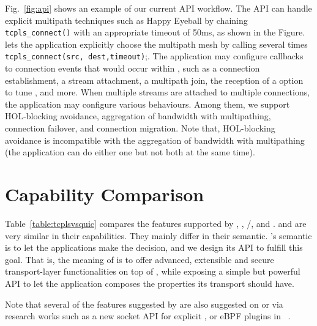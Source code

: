 Fig.~\ref{fig:api} shows an example of our current API workflow. The API can
handle explicit multipath techniques such as Happy Eyeball by chaining
\texttt{tcpls\_connect()} with an appropriate timeout of 50ms, as shown in the
Figure. \tcpls lets the application explicitly choose the multipath mesh by
calling several times \texttt{tcpls\_connect(src, dest,timeout)};. The
application may configure callbacks to connection events that would occur within
\tcpls, such as a connection establishment, a stream attachment, a multipath
join, the reception of a \tcp option to tune \tcp, and more. When multiple
streams are attached to multiple \tcp connections, the application may configure
various \tcpls behaviours. Among them, we support HOL-blocking avoidance,
aggregation of bandwidth with multipathing, connection failover, and connection
migration. Note that, HOL-blocking avoidance is incompatible with the
aggregation of bandwidth with multipathing (the application can do either one
but not both at the same time).

\section{Capability Comparison}


Table~\ref{table:tcplsvsquic} compares the features supported by
\tcp, \mptcp, \tls/\tcp, \quic and \tcpls. \quic and \tcpls are very similar in their
capabilities. They mainly differ in their semantic. \tcpls's semantic is to let
the applications make the decision, and we design its API to fulfill this goal.
That is, the meaning of \tcpls is to offer advanced, extensible and secure
transport-layer functionalities on top of \tcp, while exposing a simple but
powerful API to let the application composes the properties its transport should
have.

Note that several of the features suggested by \tcpls are also suggested on \tcp
or \quic via research works such as a new socket API for explicit \mptcp
\cite{hesmans2016enhanced}, or eBPF plugins in
\quic~\cite{de2019pluginizing}.

